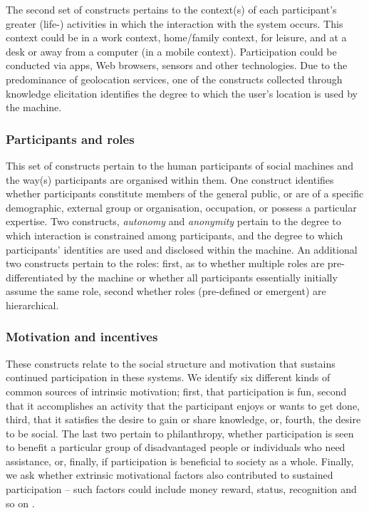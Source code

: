\documentclass{sig-alternate}
\begin{document}
The second set of constructs pertains to the context(s) of each participant's greater (life-) activities in which the interaction with the system occurs. This context could be in a work context, home/family context, for leisure, and at a desk or away from a computer (in a mobile context). Participation could be conducted via apps, Web browsers, sensors and other technologies. Due to the predominance of geolocation services, one of the constructs collected through knowledge elicitation identifies the degree to which the user's location is used by the machine.

\subsubsection{Participants and roles}
This set of constructs pertain to the human participants of social machines and the way(s) participants are organised within them. One construct identifies whether participants constitute members of the general public, or are of a specific demographic, external group or organisation, occupation, or possess a particular expertise. Two constructs, \emph{autonomy} and \emph{anonymity} pertain to the degree to which interaction is constrained among participants, and the degree to which participants' identities are used and disclosed within the machine. An additional two constructs pertain to the roles: first, as to whether multiple roles are pre-differentiated by the machine or
whether all participants essentially initially assume the same role, second whether roles (pre-defined or emergent) are hierarchical.

\subsubsection{Motivation and incentives}
These constructs relate to the social structure and motivation that sustains
continued participation in these systems. We identify six different
kinds of common sources of intrinsic motivation; first, that
participation is fun, second that it accomplishes an activity that the
participant enjoys or wants to get done, third, that it satisfies the
desire to gain or share knowledge, or, fourth, the desire to be social. The
last two pertain to philanthropy, whether participation is seen to
benefit a particular group of disadvantaged people or individuals who
need assistance, or, finally, if participation is beneficial to
society as a whole. Finally, we ask whether extrinsic motivational
factors also contributed to sustained participation -- such factors
could include money reward, status, recognition and so on \cite{kuznetsov2006motivations,lakhani2003hackers,tagging}.
\end{document}

